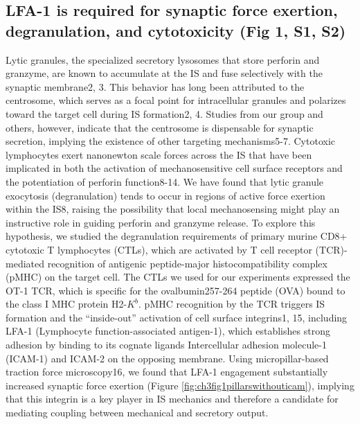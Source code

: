 \subsection{LFA-1 is required for synaptic force exertion, degranulation, and cytotoxicity (Fig 1, S1, S2)}
Lytic granules, the specialized secretory lysosomes that store perforin and granzyme, are known to accumulate at the IS and fuse selectively with the synaptic membrane2, 3. This behavior has long been attributed to the centrosome, which serves as a focal point for intracellular granules and polarizes toward the target cell during IS formation2, 4. Studies from our group and others, however, indicate that the centrosome is dispensable for synaptic secretion, implying the existence of other targeting mechanisms5-7. Cytotoxic lymphocytes exert nanonewton scale forces across the IS that have been implicated in both the activation of mechanosensitive cell surface receptors and the potentiation of perforin function8-14. We have found that lytic granule exocytosis (degranulation) tends to occur in regions of active force exertion within the IS8, raising the possibility that local mechanosensing might play an instructive role in guiding perforin and granzyme release. To explore this hypothesis, we studied the degranulation requirements of primary murine CD8+ cytotoxic T lymphocytes (CTLs), which are activated by T cell receptor (TCR)-mediated recognition of antigenic peptide-major histocompatibility complex (pMHC) on the target cell. The CTLs we used for our experiments expressed the OT-1 TCR, which is specific for the ovalbumin257-264 peptide (OVA) bound to the class I MHC protein H2-$K^{b}$. pMHC recognition by the TCR triggers IS formation and the “inside-out” activation of cell surface integrins1, 15, including LFA-1 (Lymphocyte function-associated antigen-1), which establishes strong adhesion by binding to its cognate ligands Intercellular adhesion molecule-1 (ICAM-1) and ICAM-2 on the opposing membrane. Using micropillar-based traction force microscopy16, we found that LFA-1 engagement substantially increased synaptic force exertion (Figure \ref{fig:ch3fig1pillarswithouticam}), implying that this integrin is a key player in IS mechanics and therefore a candidate for mediating coupling between mechanical and secretory output. 

